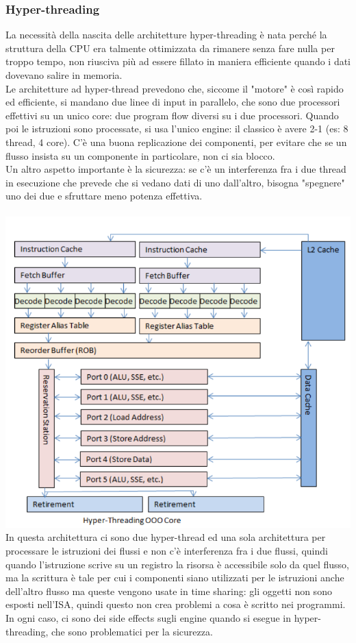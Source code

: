 \documentclass[14pt, oneside]{book}
\begin{document}
\subsubsection{Hyper-threading}
La necessità della nascita delle architetture hyper-threading è nata perché la struttura della CPU era talmente ottimizzata da rimanere senza fare nulla per troppo tempo, non riusciva più ad essere fillato in maniera efficiente quando i dati dovevano salire in memoria.\\ Le architetture ad hyper-thread prevedono che, siccome il "motore" è così rapido ed efficiente, si mandano due linee di input in parallelo, che sono due processori effettivi su un unico core: due program flow diversi su i due processori. Quando poi le istruzioni sono processate, si usa l'unico engine: il classico è avere 2-1 (es: 8 thread, 4 core). C'è una buona replicazione dei componenti, per evitare che se un flusso insista su un componente in particolare, non ci sia blocco.\\ Un altro aspetto importante è la sicurezza: se c'è un interferenza fra i due thread in esecuzione che prevede che si vedano dati di uno dall'altro, bisogna "spegnere" uno dei due e sfruttare meno potenza effettiva.
\\\\
\includegraphics[scale=0.3]{immagini/hypert-ooo}\\
In questa architettura ci sono due hyper-thread ed una sola architettura per processare le istruzioni dei flussi e non c'è interferenza fra i due flussi, quindi quando l'istruzione scrive su un registro la risorsa è accessibile solo da quel flusso, ma la scrittura è tale per cui i componenti siano utilizzati per le istruzioni anche dell'altro flusso ma queste vengono usate in time sharing: gli oggetti non sono esposti nell'ISA, quindi questo non crea problemi a cosa è scritto nei programmi. In ogni caso, ci sono dei side effects sugli engine quando si esegue in hyper-threading, che sono problematici per la sicurezza.
\end{document}
